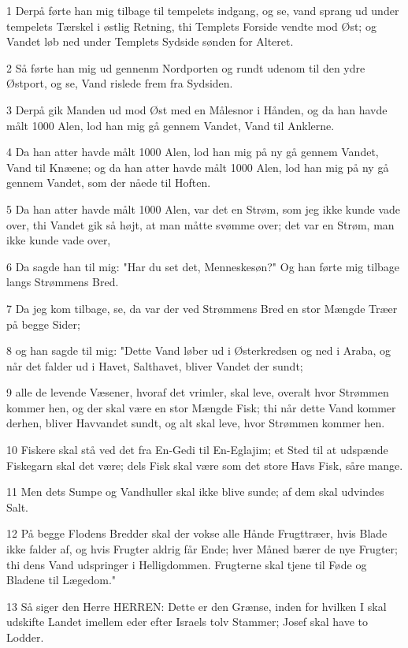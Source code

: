 \par 1 Derpå førte han mig tilbage til tempelets indgang, og se, vand sprang ud under tempelets Tærskel i østlig Retning, thi Templets Forside vendte mod Øst; og Vandet løb ned under Templets Sydside sønden for Alteret.
\par 2 Så førte han mig ud gennenm Nordporten og rundt udenom til den ydre Østport, og se, Vand rislede frem fra Sydsiden.
\par 3 Derpå gik Manden ud mod Øst med en Målesnor i Hånden, og da han havde målt 1000 Alen, lod han mig gå gennem Vandet, Vand til Anklerne.
\par 4 Da han atter havde målt 1000 Alen, lod han mig på ny gå gennem Vandet, Vand til Knæene; og da han atter havde målt 1000 Alen, lod han mig på ny gå gennem Vandet, som der nåede til Hoften.
\par 5 Da han atter havde målt 1000 Alen, var det en Strøm, som jeg ikke kunde vade over, thi Vandet gik så højt, at man måtte svømme over; det var en Strøm, man ikke kunde vade over,
\par 6 Da sagde han til mig: "Har du set det, Menneskesøn?" Og han førte mig tilbage langs Strømmens Bred.
\par 7 Da jeg kom tilbage, se, da var der ved Strømmens Bred en stor Mængde Træer på begge Sider;
\par 8 og han sagde til mig: "Dette Vand løber ud i Østerkredsen og ned i Araba, og når det falder ud i Havet, Salthavet, bliver Vandet der sundt;
\par 9 alle de levende Væsener, hvoraf det vrimler, skal leve, overalt hvor Strømmen kommer hen, og der skal være en stor Mængde Fisk; thi når dette Vand kommer derhen, bliver Havvandet sundt, og alt skal leve, hvor Strømmen kommer hen.
\par 10 Fiskere skal stå ved det fra En-Gedi til En-Eglajim; et Sted til at udspænde Fiskegarn skal det være; dels Fisk skal være som det store Havs Fisk, såre mange.
\par 11 Men dets Sumpe og Vandhuller skal ikke blive sunde; af dem skal udvindes Salt.
\par 12 På begge Flodens Bredder skal der vokse alle Hånde Frugttræer, hvis Blade ikke falder af, og hvis Frugter aldrig får Ende; hver Måned bærer de nye Frugter; thi dens Vand udspringer i Helligdommen. Frugterne skal tjene til Føde og Bladene til Lægedom."
\par 13 Så siger den Herre HERREN: Dette er den Grænse, inden for hvilken I skal udskifte Landet imellem eder efter Israels tolv Stammer; Josef skal have to Lodder.
